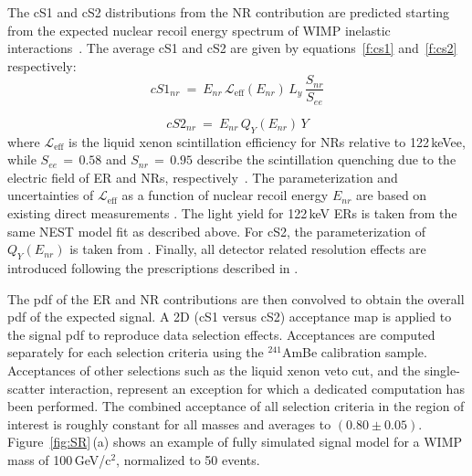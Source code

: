 The cS1 and cS2 distributions from the NR contribution are predicted starting from the expected nuclear recoil energy spectrum
of WIMP inelastic interactions~\cite{Baudis:2013bba}. The average cS1 and cS2 are given by equations~\ref{f:cs1} and~\ref{f:cs2} respectively:
\begin{equation}
cS1_{nr} ~=~ E_{nr} \, \mathcal{L}_{\text{eff}}(E_{nr}) \, L_{y} \, \frac{S_{nr}}{S_{ee}}
\label{f:cs1}
\end{equation}

\begin{equation}
cS2_{nr}  ~ = ~ E_{nr} \, Q_{Y}(E_{nr}) \, Y
\label{f:cs2}
\end{equation}
where $\mathcal{L}_{\text{eff}}$ is the liquid xenon scintillation efficiency for NRs relative to 122\,keVee, while $S_{ee} \, = \, 0.58$  and $S_{nr} \, = \, 0.95$ describe the scintillation 
quenching due to the electric field of ER and NRs, respectively~\cite{ScintQuenching}. The parameterization and uncertainties of $\mathcal{L}_{\text{eff}}$ as a function of nuclear
recoil energy $E_{nr}$ are based on existing direct measurements \cite{run8Result}. The light yield for 122\,keV ERs is taken from the same NEST model fit as described above. For cS2, the parameterization 
of $Q_{Y}(E_{nr})$ is taken from \cite{QY}. Finally, all detector related resolution effects are introduced following the prescriptions described in \cite{Aprile:2012vw}.


The pdf of the ER and NR contributions are then convolved  to obtain the overall pdf of the expected signal.
A 2D (cS1 versus cS2) acceptance map is applied to the signal pdf to reproduce data selection effects. Acceptances are computed separately for each selection 
criteria using the $^{241}$AmBe calibration sample. Acceptances of other selections such as the liquid xenon veto cut, and the single-scatter interaction, represent an exception  for which  
a dedicated computation has been performed. The combined acceptance  of all selection criteria in the region %
{\ale of interest is roughly constant for all masses and averages to $(0.80\pm0.05)$. }
Figure~\ref{fig:SR}\,(a) shows an example of fully simulated signal model for a WIMP mass of 100\,GeV/c$^2$, normalized to 50 events. 

